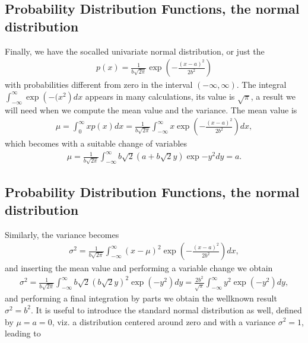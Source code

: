 \documentclass[letterpaper,10pt,english]{sphinxmanual}
\begin{document}
\subsection{Probability Distribution Functions, the normal distribution}
\label{\detokenize{chapter3:probability-distribution-functions-the-normal-distribution}}
Finally, we have the so\sphinxhyphen{}called univariate normal  distribution, or just the 
\begin{equation*}
\begin{split}
p(x)=\frac{1}{b\sqrt{2\pi}}\exp{\left(-\frac{(x-a)^2}{2b^2}\right)}
\end{split}
\end{equation*}
with probabilities different from zero in the interval \((-\infty,\infty)\).
The integral \(\int_{-\infty}^{\infty}\exp{\left(-(x^2\right)}dx\) appears in many calculations, its value
is \(\sqrt{\pi}\),  a result we will need when we compute the mean value and the variance.
The mean value is
\begin{equation*}
\begin{split}
\mu = \int_0^{\infty}xp(x)dx=\frac{1}{b\sqrt{2\pi}}\int_{-\infty}^{\infty}x \exp{\left(-\frac{(x-a)^2}{2b^2}\right)}dx,
\end{split}
\end{equation*}
which becomes with a suitable change of variables
\begin{equation*}
\begin{split}
\mu =\frac{1}{b\sqrt{2\pi}}\int_{-\infty}^{\infty}b\sqrt{2}(a+b\sqrt{2}y)\exp{-y^2}dy=a.
\end{split}
\end{equation*}

\subsection{Probability Distribution Functions, the normal distribution}
\label{\detokenize{chapter3:id2}}
Similarly, the variance becomes
\begin{equation*}
\begin{split}
\sigma^2 = \frac{1}{b\sqrt{2\pi}}\int_{-\infty}^{\infty}(x-\mu)^2 \exp{\left(-\frac{(x-a)^2}{2b^2}\right)}dx,
\end{split}
\end{equation*}
and inserting the mean value and performing a variable change we obtain
\begin{equation*}
\begin{split}
\sigma^2 = \frac{1}{b\sqrt{2\pi}}\int_{-\infty}^{\infty}b\sqrt{2}(b\sqrt{2}y)^2\exp{\left(-y^2\right)}dy=
\frac{2b^2}{\sqrt{\pi}}\int_{-\infty}^{\infty}y^2\exp{\left(-y^2\right)}dy,
\end{split}
\end{equation*}
and performing a final integration by parts we obtain the well\sphinxhyphen{}known result \(\sigma^2=b^2\).
It is useful to introduce the standard normal distribution as well, defined by \(\mu=a=0\), viz. a distribution
centered around zero and with a variance \(\sigma^2=1\), leading to
\end{document}
